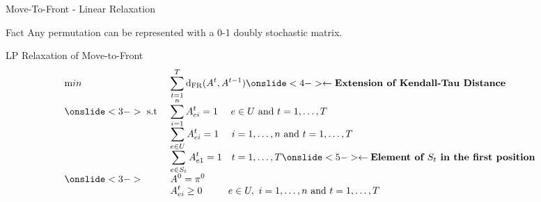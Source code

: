 \documentclass{beamer}
\begin{document}
\begin{frame}{Move-To-Front - Linear Relaxation}
        \begin{block}{Fact}
            Any permutation can be represented with a 0-1 doubly stochastic matrix.
        \end{block}
    
    \begin{block}{LP Relaxation of Move-to-Front}
        \begin{equation*}
            \begin{array}{ll@{}ll}
                \text min & \displaystyle \sum_{t=1}^{T} \mathrm{d}_{\mathrm{FR}}(A^t,A^{t-1}) \onslide<4-> \leftarrow \textbf{Extension of Kendall-Tau Distance}&\\
                \onslide<3-> \text{ s.t } & \displaystyle \sum_{i=1}^{n} A_{ei}^t = 1 ~~~~e \in U\text{ and } t = 1,\ldots, T &&\\
                & \displaystyle \sum_{e \in U} A_{ei}^t = 1 ~~~~i = 1,\ldots,n\text{ and } t = 1,\ldots, T&\\
                & \displaystyle \sum_{e \in S_t} A_{e1}^t = 1 ~~~ t = 1,\ldots, T \onslide<5-> \leftarrow \textbf{Element of $S_t$ in the first position}&\\
                \onslide<3-> & \displaystyle A^0 = \pi^0 &&\\
                & \displaystyle A_{ei}^t \geq 0 ~~~~~~~~ e \in U, ~i = 1,\ldots, n\text{ and } t = 1,\ldots, T&\\
            \end{array}
        \end{equation*}
    \end{block}
\end{frame}
\end{document}
